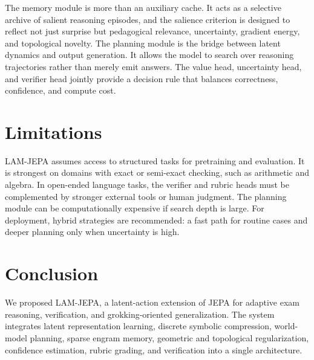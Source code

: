 \documentclass[11pt]{article}
\newcommand{\1}{\mathbbm{1}}
\begin{document}
The memory module is more than an auxiliary cache. It acts as a selective archive of salient reasoning episodes, and the salience criterion is designed to reflect not just surprise but pedagogical relevance, uncertainty, gradient energy, and topological novelty. The planning module is the bridge between latent dynamics and output generation. It allows the model to search over reasoning trajectories rather than merely emit answers. The value head, uncertainty head, and verifier head jointly provide a decision rule that balances correctness, confidence, and compute cost.

\section{Limitations}
LAM-JEPA assumes access to structured tasks for pretraining and evaluation. It is strongest on domains with exact or semi-exact checking, such as arithmetic and algebra. In open-ended language tasks, the verifier and rubric heads must be complemented by stronger external tools or human judgment. The planning module can be computationally expensive if search depth is large. For deployment, hybrid strategies are recommended: a fast path for routine cases and deeper planning only when uncertainty is high.

\section{Conclusion}
We proposed LAM-JEPA, a latent-action extension of JEPA for adaptive exam reasoning, verification, and grokking-oriented generalization. The system integrates latent representation learning, discrete symbolic compression, world-model planning, sparse engram memory, geometric and topological regularization, confidence estimation, rubric grading, and verification into a single architecture.
\end{document}
